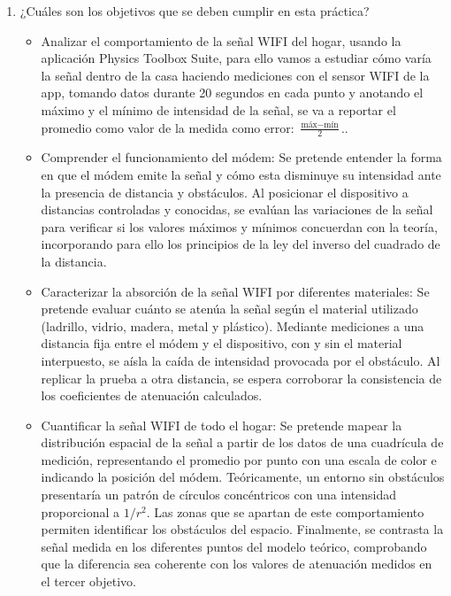 \documentclass{article}
\begin{document}
\begin{enumerate}
		\vspace{0.3cm}
		
		\item ¿Cuáles son los objetivos que se deben cumplir en esta práctica?
		
		\vspace{0.3cm}
		
		\begin{itemize}
			\item Analizar el comportamiento de la señal WIFI del hogar, usando la aplicación Physics Toolbox Suite, para ello vamos a estudiar cómo varía la señal dentro de la casa haciendo mediciones con el sensor WIFI de la app, tomando datos durante 20 segundos en cada punto y anotando el máximo y el mínimo de intensidad de la señal, se va a reportar el promedio como valor de la medida como error: $\frac{\text{máx}-\text{mín}}{2}$..
			\item Comprender el funcionamiento del módem:
			Se pretende entender la forma en que el módem emite la señal y cómo esta disminuye su intensidad ante la presencia de distancia y obstáculos. Al posicionar el dispositivo a distancias controladas y conocidas, se evalúan las variaciones de la señal para verificar si los valores máximos y mínimos concuerdan con la teoría, incorporando para ello los principios de la ley del inverso del cuadrado de la distancia.
			\item Caracterizar la absorción de la señal WIFI por diferentes materiales:
			Se pretende evaluar cuánto se atenúa la señal según el material utilizado (ladrillo, vidrio, madera, metal y plástico). Mediante mediciones a una distancia fija entre el módem y el dispositivo, con y sin el material interpuesto, se aísla la caída de intensidad provocada por el obstáculo. Al replicar la prueba a otra distancia, se espera corroborar la consistencia de los coeficientes de atenuación calculados.
			\item Cuantificar la señal WIFI de todo el hogar:
			Se pretende mapear la distribución espacial de la señal a partir de los datos de una cuadrícula de medición, representando el promedio por punto con una escala de color e indicando la posición del módem. Teóricamente, un entorno sin obstáculos presentaría un patrón de círculos concéntricos con una intensidad proporcional a $1/r^2$. Las zonas que se apartan de este comportamiento permiten identificar los obstáculos del espacio. Finalmente, se contrasta la señal medida en los diferentes puntos del modelo teórico, comprobando que la diferencia sea coherente con los valores de atenuación medidos en el tercer objetivo.    
		\end{itemize}
		

\end{enumerate}
\end{document}
